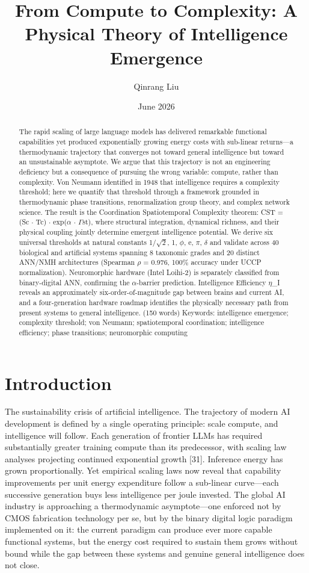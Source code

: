 \documentclass[a4paper,12pt]{article}
\title{From Compute to Complexity: A Physical Theory of Intelligence Emergence}
\author{Qinrang Liu}
\date{June 2026}
\begin{document}
\maketitle

\begin{abstract}
The rapid scaling of large language models has delivered remarkable functional capabilities yet produced exponentially growing energy costs with sub-linear returns---a thermodynamic trajectory that converges not toward general intelligence but toward an unsustainable asymptote.
We argue that this trajectory is not an engineering deficiency but a consequence of pursuing the wrong variable: compute, rather than complexity.
Von Neumann identified in 1948 that intelligence requires a complexity threshold; here we quantify that threshold through a framework grounded in thermodynamic phase transitions, renormalization group theory, and complex network science.
The result is the Coordination Spatiotemporal Complexity theorem: CST = (Sc $\cdot$ Tc) $\cdot$ exp($\alpha$ $\cdot$ $\Gamma$st), where structural integration, dynamical richness, and their physical coupling jointly determine emergent intelligence potential.
We derive six universal thresholds at natural constants {1/$\sqrt{2}$, 1, $\phi$, e, $\pi$, $\delta$} and validate across 40 biological and artificial systems spanning 8 taxonomic grades and 20 distinct ANN/NMH architectures (Spearman $\rho$ = 0.976, 100\% accuracy under UCCP normalization).
Neuromorphic hardware (Intel Loihi-2) is separately classified from binary-digital ANN, confirming the $\alpha$-barrier prediction.
Intelligence Efficiency $\eta$\_I reveals an approximately six-order-of-magnitude gap between brains and current AI, and a four-generation hardware roadmap identifies the physically necessary path from present systems to general intelligence. (150 words) Keywords: intelligence emergence; complexity threshold; von Neumann; spatiotemporal coordination; intelligence efficiency; phase transitions; neuromorphic computing
\end{abstract}

\section{Introduction}

The sustainability crisis of artificial intelligence.
The trajectory of modern AI development is defined by a single operating principle: scale compute, and intelligence will follow.
Each generation of frontier LLMs has required substantially greater training compute than its predecessor, with scaling law analyses projecting continued exponential growth [31].
Inference energy has grown proportionally.
Yet empirical scaling laws now reveal that capability improvements per unit energy expenditure follow a sub-linear curve---each successive generation buys less intelligence per joule invested.
The global AI industry is approaching a thermodynamic asymptote---one enforced not by CMOS fabrication technology per se, but by the binary digital logic paradigm implemented on it: the current paradigm can produce ever more capable functional systems, but the energy cost required to sustain them grows without bound while the gap between these systems and genuine general intelligence does not close.
\end{document}
